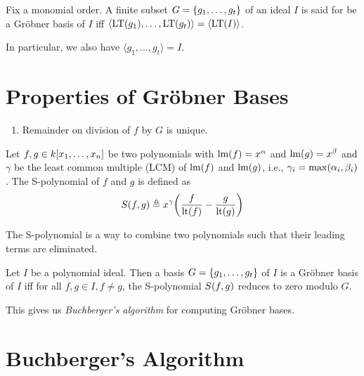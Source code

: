 \documentclass[twoside]{article}
\begin{document}
\begin{definition}
    Fix a monomial order. A finite subset \(G = \{g_1, \ldots, g_t\}\) of an
    ideal \(I\) is said for be a Gr\"{o}bner basis of \(I\) iff \(\langle
    \mathrm{LT}(g_1), \ldots, \mathrm{LT}(g_t) \rangle = \langle
    \mathrm{LT}(I) \rangle\).
\end{definition}
In particular, we also have \(\langle g_1, \ldots, g_t \rangle = I\).

\section{Properties of Gr\"{o}bner Bases}
\label{sec:properties-of-groebner-bases}

\begin{enumerate}
    \item Remainder on division of \(f\) by \(G\) is unique.
\end{enumerate}

\begin{definition}[S-Polynomial]
    Let \(f, g \in k[x_1, \ldots, x_n]\) be two polynomials with
    \(\mathrm{lm}(f) = x^\alpha\) and \(\mathrm{lm}(g) = x^\beta\) and
    \(\gamma\) be the least common multiple (LCM) of \(\mathrm{lm}(f)\) and
    \(\mathrm{lm}(g)\), i.e., \(\gamma_i = \max(\alpha_i, \beta_i)\).
    The S-polynomial of \(f\) and \(g\) is defined as
    \begin{equation}
        S\brak{f, g} \triangleq x^\gamma \brak*{\frac{f}{\mathrm{lt}\brak{f}} - \frac{g}{\mathrm{lt}\brak{g}}}
        \label{eq:s-polynomial}
    \end{equation}
\end{definition}
The S-polynomial is a way to combine two polynomials such that their leading
terms are eliminated.

\begin{theorem}
    Let \(I\) be a polynomial ideal. Then a basis \(G = \{g_1, \ldots,
    g_t\}\) of \(I\) is a Gr\"{o}bner basis of \(I\) iff for all \(f, g \in I, f
    \neq g\), the S-polynomial \(S(f, g)\) reduces to zero modulo \(G\).
\end{theorem}
This gives us \emph{Buchberger's algorithm} for computing Gr\"{o}bner bases.

\section{Buchberger's Algorithm}
\end{document}
